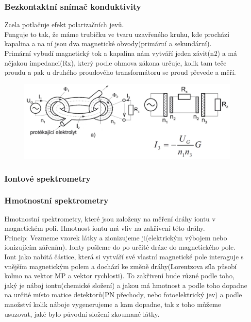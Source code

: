 \subsubsection*{Bezkontaktní snímač konduktivity}
Zcela potlačuje efekt polarizačních jevů.\\
Funguje to tak, že máme trubičku ve tvaru uzavřeného kruhu, kde prochází kapalina a na ní jsou dva magnetické obvody(primární a sekundární).\\
Primární vybudí magnetický tok a kapalina nám vytváří jeden závit(n2) a má nějakou impedanci(Rx), který podle ohmova zákona určuje, kolik tam teče proudu a pak u druhého proudového transformátoru se proud převede a měří.\\
\begin{figure}[h!]
    \centering
    \includegraphics[scale = 0.1]{img/BezkSnimVod.png}
\end{figure}

\subsubsection{Iontové spektrometry}
\subsubsection*{Hmotnostní spektrometry}
Hmotnostní spektrometry, které jsou založeny na měření dráhy iontu v magnetickém poli. Hmotnost iontu má vliv na zakřivení této dráhy.\\
Princip: Vezmeme vzorek látky a zionizujeme ji(elektrickým výbojem nebo ionizujícím zářením). Ionty pošleme do po určité dráze do magnetického pole. Iont jako nabitá částice, která si vytváří své vlastní magnetické pole interaguje s vnějším magnetickým polem a dochází ke změně dráhy(Lorentzova síla působí kolmo na vektor MP a vektor rychlosti). To zakřivení bude různé podle toho, jaký je náboj iontu(chemické složení) a jakou má hmotnost a podle toho dopadne na určité místo matice detektorů(PN přechody, nebo fotoelektrický jev) a podle množství kolik náboje vygenerujeme a kam dopadne, tak z toho můžeme usuzovat, jaké bylo původní složení zkoumané látky.\\
